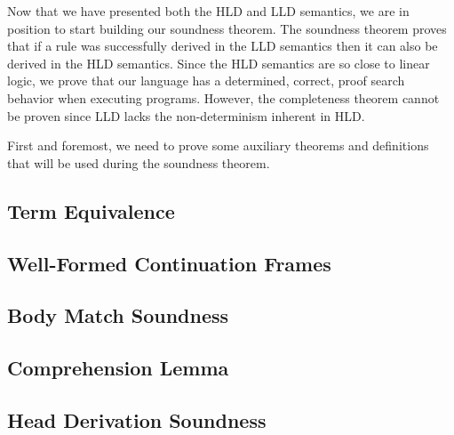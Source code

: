 
Now that we have presented both the HLD and LLD semantics, we are in position to start building our soundness theorem.
The soundness theorem proves that if a rule was successfully derived in the LLD semantics then it can also be derived
in the HLD semantics. Since the HLD semantics are so close to linear logic, we prove that our language has a determined, correct,
proof search behavior when executing programs. However, the completeness theorem cannot be proven since LLD lacks the non-determinism
inherent in HLD.


First and foremost, we need to prove some auxiliary theorems and definitions that will be used during the soundness theorem.

\subsection{Term Equivalence}


\subsection{Well-Formed Continuation Frames}


\subsection{Body Match Soundness}


\subsection{Comprehension Lemma}


\subsection{Head Derivation Soundness}
